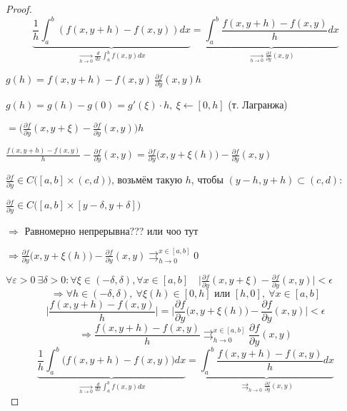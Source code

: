     \begin{proof}
        \[
            \underbrace{\frac{1}{h} \int_a^b (f(x, y+h) - f(x, y)) dx}_{\xrightarrow[h \rightarrow 0]{} \frac{d}{dx}\int_a^b f(x, y) dx} = \underbrace{\int_a^b \frac{f(x, y + h) - f(x, y)}{h} dx}_{\xrightarrow[h \rightarrow 0]{} \frac{\partial f}{\partial y}(x, y)}   
        \] %
        \par $g(h) = f(x, y+h) - f(x, y) \ \frac{\partial f}{\partial y}(x, y) h$
        \par $g(h) = g(h) - g(0) = g'(\xi)\cdot h, \ \xi \leftarrow [0, h]$ \quad (т. Лагранжа)
        \par $= \Big(\frac{\partial f}{\partial y}(x, y + \xi) - \frac{\partial f}{\partial y}(x, y)\Big)h$
        \par $\frac{f(x, y+h) - f(x, y)}{h} - \frac{\partial f}{\partial y}(x, y) = \frac{\partial f}{\partial y}\big(x, y + \xi(h)\big) - \frac{\partial f}{\partial y}(x, y)$
        \par $\frac{\partial f}{\partial y} \in C\big([a, b] \times (c, d)\big)$, возьмём такую $h$, чтобы $(y-h, y+h) \subset (c,d):$
        \par $\frac{\partial f}{\partial y} \in C\big([a, b] \times [y - \delta, y + \delta]\big)$
        \par $\Rightarrow$ Равномерно непрерывна??? или чоо тут
        \par $\Rightarrow \frac{\partial f}{\partial y} \big(x, y + \xi(h)\big) - \frac{\partial f}{\partial y}(x, y) \rightrightarrows_{h \rightarrow 0}^{x \in [a, b] } 0$ %
        \par $\forall \varepsilon > 0 \ \exists \delta > 0: \forall \xi \in (-\delta, \delta), \forall x \in [a,b] \quad \Big|\frac{\partial f}{\partial y}(x, y + \xi) - \frac{\partial f}{\partial y}(x, y)\Big| < \epsilon$
        \[
            \Rightarrow \forall h \in (-\delta, \delta), \ \forall \xi(h) \in [0, h] \text{ или } [h, 0], \ \forall x \in [a, b]    
        \]
        \[
            \Big|\frac{f(x, y + h) - f(x, y)}{h}\Big| = \Big|\frac{\partial f}{\partial y}\big(x, y + \xi(h)\big) - \frac{\partial f}{\partial y}(x, y)\Big| < \epsilon    
        \]
        \[
            \Rightarrow \frac{f(x, y+h) - f(x, y)}{h} \rightrightarrows_{h \rightarrow 0}^{x \in [a, b]} \frac{\partial f}{\partial y}(x, y)    
        \]
        \[
            \underbrace{\frac{1}{h} \int_a^b \big(f(x, y+h) - f(x, y)\big) dx}_{\xrightarrow[h \rightarrow 0]{} \frac{d}{dx}\int_a^b f(x, y) dx} = \underbrace{\int_a^b \frac{f(x, y + h) - f(x, y)}{h} dx}_{\rightrightarrows_{h \rightarrow 0}{} \frac{\partial f}{\partial y}(x, y)} %
        \] %
    \end{proof}

